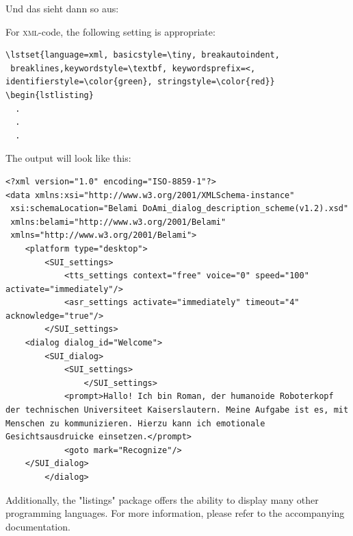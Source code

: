 Und das sieht dann so aus:




For \textsc{xml}-code, the following setting is appropriate:

\begin{verbatim}
\lstset{language=xml, basicstyle=\tiny, breakautoindent,
 breaklines,keywordstyle=\textbf, keywordsprefix=<, 
identifierstyle=\color{green}, stringstyle=\color{red}} 
\begin{lstlisting} 
  .
  .
  . 
\end{verbatim}

The output will look like this:


\begin{lstlisting} 
<?xml version="1.0" encoding="ISO-8859-1"?>
<data xmlns:xsi="http://www.w3.org/2001/XMLSchema-instance"
 xsi:schemaLocation="Belami DoAmi_dialog_description_scheme(v1.2).xsd"
 xmlns:belami="http://www.w3.org/2001/Belami"
 xmlns="http://www.w3.org/2001/Belami">
    <platform type="desktop">
        <SUI_settings>
            <tts_settings context="free" voice="0" speed="100" activate="immediately"/>
            <asr_settings activate="immediately" timeout="4" acknowledge="true"/>
        </SUI_settings>	       
	<dialog dialog_id="Welcome">
		<SUI_dialog>
	    	<SUI_settings>
                </SUI_settings>
			<prompt>Hallo! Ich bin Roman, der humanoide Roboterkopf der technischen Universiteet Kaiserslautern. Meine Aufgabe ist es, mit Menschen zu kommunizieren. Hierzu kann ich emotionale Gesichtsausdruicke einsetzen.</prompt>
			<goto mark="Recognize"/>
	</SUI_dialog>
        </dialog>

\end{lstlisting}

Additionally, the "listings" package offers the ability to display many other programming languages. For more information, please refer to the accompanying documentation.

